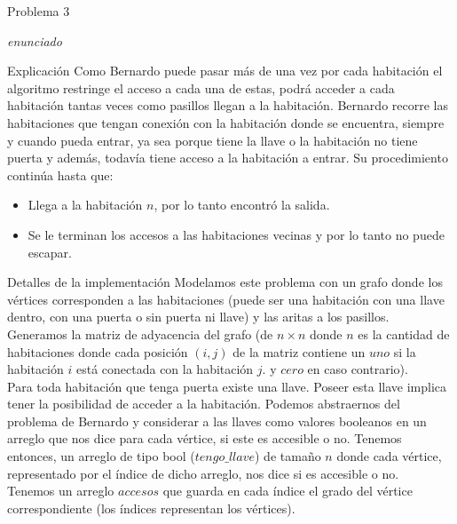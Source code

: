 \begin{section}{Problema 3}

	\textit{enunciado}

	\begin{subsection}{Explicación}
		Como Bernardo puede pasar más de una vez por cada habitación el algoritmo restringe el acceso a cada una de estas, podrá acceder a cada habitación tantas veces como pasillos llegan a la habitación.
		Bernardo recorre las habitaciones que tengan conexión con la habitación donde se encuentra, siempre y cuando pueda entrar, ya sea porque tiene la llave o la habitación no tiene puerta y además, todavía tiene acceso a la habitación a entrar. Su procedimiento continúa hasta que:
		\begin{itemize}
			\item Llega a la habitación $n$, por lo tanto encontró la salida.
			\item Se le terminan los accesos a las habitaciones vecinas y por lo tanto no puede escapar.
		\end{itemize}

	\end{subsection}

	\begin{subsection}{Detalles de la implementación}
		Modelamos este problema con un grafo donde los vértices corresponden a las habitaciones (puede ser una habitación con una llave dentro, con una puerta o sin puerta ni llave) y las aritas a los pasillos.\\	

		Generamos la matriz de adyacencia del grafo (de $n\times n$ donde $n$ es la cantidad de habitaciones donde cada posición $(i,j)$ de la matriz contiene un $uno$ si la habitación $i$ está conectada con la habitación $j$. y $cero$ en caso contrario).\\

		Para toda habitación que tenga puerta existe una llave. Poseer esta llave implica tener la posibilidad de acceder a la habitación. Podemos abstraernos del problema de Bernardo y considerar a las llaves como valores booleanos en un arreglo que nos dice para cada vértice, si este es accesible o no. Tenemos entonces, un arreglo de tipo bool ($tengo\_llave$) de tamaño $n$ donde cada vértice, representado por el índice de dicho arreglo, nos dice si es accesible o no.\\

		Tenemos un arreglo $accesos$ que guarda en cada índice el grado del vértice correspondiente (los índices representan los vértices).\\


\end{subsection}
\end{section}

